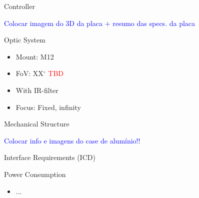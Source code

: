 
\begin{frame}{Controller}

\textcolor{blue}{Colocar imagem do 3D da placa + resumo das specs. da placa}

\end{frame}


\begin{frame}{Optic System}

    \begin{itemize}
        \item Mount: M12
        \item FoV: XX$^{\circ}$ \textcolor{red}{TBD}
        \item With IR-filter
        \item Focus: Fixed, infinity
    \end{itemize}

\end{frame}


\begin{frame}{Mechanical Structure}

\textcolor{blue}{Colocar info e imagens do case de alumínio!!}

\end{frame}


\begin{frame}{Interface Requirements (ICD)}

\end{frame}


\begin{frame}{Power Consumption}

    \begin{itemize}
        \item ...
    \end{itemize}

\end{frame}

